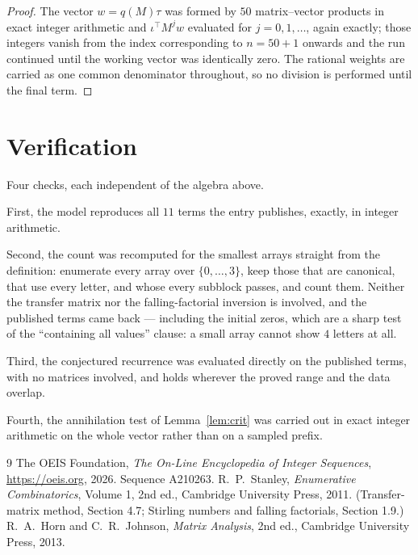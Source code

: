 \documentclass[11pt,a4paper]{article}
\theoremstyle{plain}
\theoremstyle{definition}
\begin{document}
\begin{proof}
The vector $w=q(M)\tau$ was formed by $50$ matrix--vector products in exact integer
arithmetic and $\iota^{\!\top}M^{j}w$ evaluated for $j=0,1,\dots$, again exactly; those
integers vanish from the index corresponding to $n=50+1$ onwards and the run continued
until the working vector was identically zero. The rational weights are carried as one common
denominator throughout, so no division is performed until the final term.
\end{proof}

\section{Verification}

Four checks, each independent of the algebra above.

First, the model reproduces all $11$ terms the entry publishes, exactly, in integer
arithmetic.

Second, the count was recomputed for the smallest arrays straight from the definition:
enumerate every array over $\{0,\dots,3\}$, keep those that are canonical, that use every
letter, and whose every subblock passes, and count them. Neither the transfer matrix nor the
falling-factorial inversion is involved, and the published terms came back --- including the
initial zeros, which are a sharp test of the ``containing all values'' clause: a small array
cannot show $4$ letters at all.

Third, the conjectured recurrence was evaluated directly on the published terms, with no
matrices involved, and holds wherever the proved range and the data overlap.

Fourth, the annihilation test of Lemma~\ref{lem:crit} was carried out in exact integer
arithmetic on the whole vector rather than on a sampled prefix.

\begin{thebibliography}{9}
 The OEIS Foundation, \emph{The On-Line Encyclopedia of Integer
Sequences}, \url{https://oeis.org}, 2026. Sequence A210263.
 R.~P.~Stanley, \emph{Enumerative Combinatorics}, Volume 1, 2nd ed.,
Cambridge University Press, 2011. (Transfer-matrix method, Section 4.7; Stirling numbers and
falling factorials, Section 1.9.)
 R.~A.~Horn and C.~R.~Johnson, \emph{Matrix Analysis}, 2nd ed., Cambridge
University Press, 2013.
\end{thebibliography}
\end{document}
